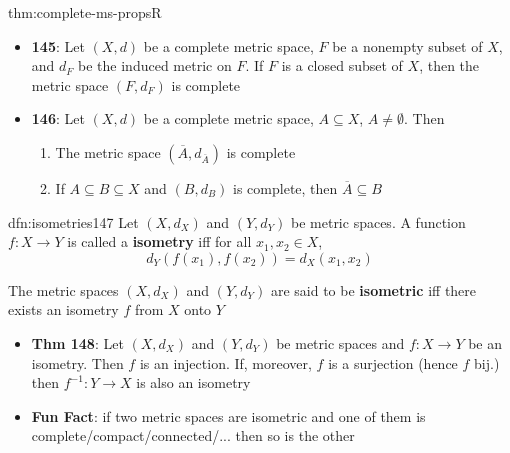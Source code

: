 \documentclass[landscape, 8pt]{extarticle}
\begin{document}
\begin{multicols}{3}
\begin{thm}{thm:complete-ms-props}{R}
\begin{itemize}[leftmargin=*]
        \item \textbf{145}: Let $(X, d)$ be a complete metric space, $F$ be a nonempty subset of $X$, and $d_{F}$ be the induced metric on $F$. If $F$ is a closed subset of $X$, then the metric space $(F, d_{F})$ is complete

        \item \textbf{146}: Let $(X, d)$ be a complete metric space, $A \subseteq X$, $A \ne \emptyset$. Then
            \vspace{-5pt}
            \begin{enumerate}
                \item The metric space $(\overline{A}, d_{\overline{A}})$ is complete
                \item If $A \subseteq B \subseteq X$ and $(B, d_{B})$ is complete, then $\overline{A} \subseteq B$
            \end{enumerate}
    \end{itemize}
\end{thm}

\begin{dfn}[Isometries]{dfn:isometries}{147}
    \vspace{-5pt}
    Let $(X, d_{X})$ and $(Y, d_{Y})$ be metric spaces. A function $f : X \to Y$ is called a \textbf{isometry} iff for all $x_{1}, x_{2}\in X$,
    \[d_{Y}(f(x_{1}), f(x_{2})) = d_{X}(x_{1}, x_{2})\]

    The metric spaces $(X, d_{X})$ and $(Y, d_{Y})$ are said to be \textbf{isometric} iff there exists an isometry $f$ from $X$ onto $Y$

    \vspace{-8pt}

    \begin{itemize}[leftmargin=*]
        \item \textbf{Thm 148}: Let $(X, d_{X})$ and $(Y, d_{Y})$ be metric spaces and $f : X \to Y$ be an isometry. Then $f$ is an injection. If, moreover, $f$ is a surjection (hence $f$ bij.) then $f^{-1} : Y \to X$ is also an isometry
        \item \textbf{Fun Fact}: if two metric spaces are isometric and one of them is complete/compact/connected/... then so is the other
    \end{itemize}
\end{dfn}


\end{multicols}
\end{document}
